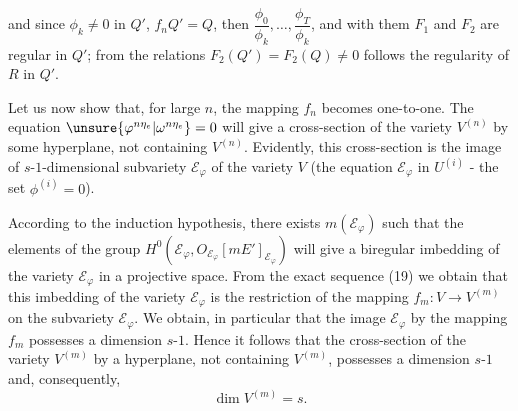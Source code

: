 and since $\phi_k\ne0$ in $Q'$, $f_nQ'=Q$, then $\dfrac{\phi_0}{\phi_k},\ldots,\dfrac{\phi_T}{\phi_k}$, and with them $F_1$ and $F_2$ are regular in $Q'$; from the relations $F_2(Q')=F_2(Q)\ne0$ follows the regularity of $R$ in $Q'$.

Let us now show that, for large $n$, the mapping $f_n$ becomes one-to-one. The equation $\unsure{\varphi^{n\eta_e}|\omega^{n\eta_e}}=0$ will give a cross-section of the variety $V^{(n)}$ by some hyperplane, not containing $V^{(n)}$. Evidently, this cross-section is the image of $s$-$1$-dimensional subvariety $\mathcal E_\varphi$ of the variety $V$ (the equation $\mathcal E_\varphi$ in $U^{(i)}$ - the set $\phi^{(i)}=0$).

According to the induction hypothesis, there exists $m(\mathcal E_\varphi)$ such that the elements of the group  $H^0(\mathcal E_\varphi,O_{\mathcal E_\varphi}[mE']_{\mathcal E_\varphi})$ will give a biregular imbedding of the variety $\mathcal E_\varphi$ in a projective space. From the exact sequence (19) we obtain that this imbedding of the variety $\mathcal E_\varphi$ is the restriction of the mapping $f_m:V\to V^{(m)}$ on the subvariety $\mathcal E_\varphi$. We obtain, in particular that the image $\mathcal E_\varphi$ by the mapping $f_m$ possesses a dimension $s$-$1$. Hence it follows that the cross-section of the variety $V^{(m)}$ by a hyperplane, not containing $V^{(m)}$, possesses a dimension $s$-$1$ and, consequently,
\[
\dim V^{(m)}=s.
\]
